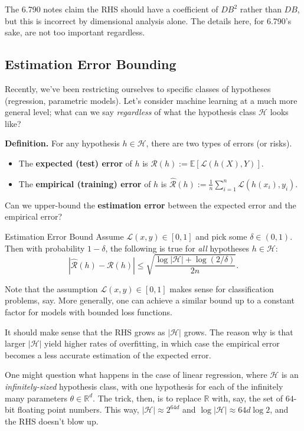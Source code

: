 \begin{remark}
    The 6.790 notes claim the RHS should have a coefficient of $DB^2$
    rather than $DB$, but this is incorrect
    by dimensional analysis alone.
    The details here, for 6.790's sake,
    are not too important regardless.
\end{remark}

\subsection{Estimation Error Bounding}

Recently, we've been restricting ourselves
to specific classes of hypotheses (regression, parametric models).
Let's consider machine learning
at a much more general level;
what can we say \emph{regardless} of
what the hypothesis class $\mathcal{H}$ looks like?

\textbf{Definition.}
For any hypothesis $h \in \mathcal{H}$,
there are two types of errors (or risks).
\begin{itemize}
    \item The \textbf{expected (test) error} of $h$ is
    $\mathcal{R}(h) := \mathbb{E}\left[\mathcal{L}(h(X), Y)\right]$.
    \item The \textbf{empirical (training) error} of $h$ is
    $\hat{\mathcal{R}}(h) := \frac{1}{n} \sum_{i = 1}^n
    \mathcal{L}(h(x_i), y_i)$.
\end{itemize}

Can we upper-bound the \textbf{estimation error}
between the expected error and the empirical error?

\begin{theorem}{Estimation Error Bound}
    Assume $\mathcal{L}(x, y) \in [0, 1]$
    and pick some $\delta \in (0, 1)$.
    Then with probability $1 - \delta$,
    the following is true
    for \emph{all} hypotheses $h \in \mathcal{H}$:
    \[
    \left|\hat{\mathcal{R}}(h) - \mathcal{R}(h)\right|
    \leq \sqrt{\frac{\log|\mathcal{H}| + \log(2/\delta)}{2n}}.
    \]
\end{theorem}

Note that the assumption $\mathcal{L}(x, y) \in [0, 1]$
makes sense for classification problems, say.
More generally, one can achieve a similar bound
up to a constant factor for models with bounded loss functions.

\begin{remark}
    It should make sense that the RHS grows as $|\mathcal{H}|$ grows.
    The reason why is that larger $|\mathcal{H}|$ yield
    higher rates of overfitting,
    in which case the empirical error
    becomes a less accurate estimation of the expected error.

    One might question what happens in the case of linear regression,
    where $\mathcal{H}$ is an \emph{infinitely-sized}
    hypothesis class, with one hypothesis for each of the
    infinitely many parameters $\theta \in \mathbb{R}^d$.
    The trick, then, is to replace $\mathbb{R}$
    with, say, the set of $64$-bit floating point numbers.
    This way, $|\mathcal{H}| \approx 2^{64d}$ and
    $\log |\mathcal{H}| \approx 64d \log 2$,
    and the RHS doesn't blow up.
\end{remark}

